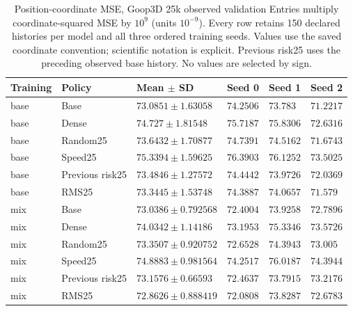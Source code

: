 \begin{table}[p]
\centering\scriptsize
\caption{Position-coordinate MSE, Goop3D 25k observed validation Entries multiply coordinate-squared MSE by $10^9$ (units $10^{-9}$). Every row retains 150 declared histories per model and all three ordered training seeds. Values use the saved coordinate convention; scientific notation is explicit. Previous risk25 uses the preceding observed base history. No values are selected by sign.}
\label{tab:goop3d25k-observed-position-validation}
\setlength{\tabcolsep}{3pt}
\begin{tabular}{llllll}
\toprule
Training & Policy & Mean $\pm$ SD & Seed 0 & Seed 1 & Seed 2\\
\midrule
base & Base & $73.0851\pm1.63058$ & $74.2506$ & $73.783$ & $71.2217$\\
base & Dense & $74.727\pm1.81548$ & $75.7187$ & $75.8306$ & $72.6316$\\
base & Random25 & $73.6432\pm1.70877$ & $74.7391$ & $74.5162$ & $71.6743$\\
base & Speed25 & $75.3394\pm1.59625$ & $76.3903$ & $76.1252$ & $73.5025$\\
base & Previous risk25 & $73.4846\pm1.27572$ & $74.4442$ & $73.9726$ & $72.0369$\\
base & RMS25 & $73.3445\pm1.53748$ & $74.3887$ & $74.0657$ & $71.579$\\
mix & Base & $73.0386\pm0.792568$ & $72.4004$ & $73.9258$ & $72.7896$\\
mix & Dense & $74.0342\pm1.14186$ & $73.1953$ & $75.3346$ & $73.5726$\\
mix & Random25 & $73.3507\pm0.920752$ & $72.6528$ & $74.3943$ & $73.005$\\
mix & Speed25 & $74.8883\pm0.981564$ & $74.2517$ & $76.0187$ & $74.3944$\\
mix & Previous risk25 & $73.1576\pm0.66593$ & $72.4637$ & $73.7915$ & $73.2176$\\
mix & RMS25 & $72.8626\pm0.888419$ & $72.0808$ & $73.8287$ & $72.6783$\\
\bottomrule
\end{tabular}
\end{table}

